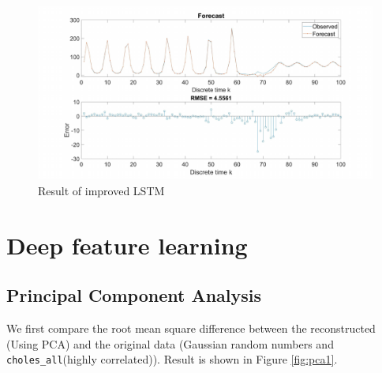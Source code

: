 \documentclass{article}
\begin{document}
\begin{figure}[h!]
  \centering
  \includegraphics[width=\textwidth]{lab2/lstmimproved.pdf}
  \caption{Result of improved LSTM}
  \label{fig:lstmimprovedresult}
\end{figure}


\section{Deep feature learning}

\subsection{Principal Component Analysis}

We first compare the root mean square difference between the reconstructed (Using PCA) and the original data (Gaussian random numbers and \verb|choles_all|(highly correlated)). Result is shown in Figure \ref{fig:pca1}.
\end{document}
